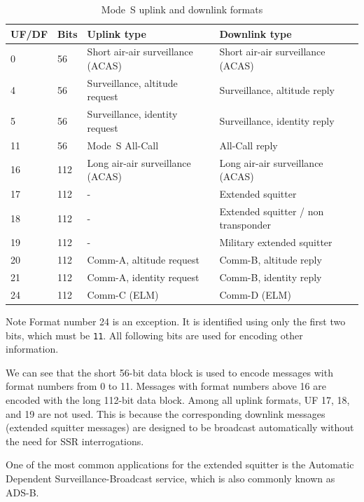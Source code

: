 \begin{table}[ht]
\centering
\footnotesize
\caption{Mode~S uplink and downlink formats}
\label{tb:mode_s_formats}
\begin{tabular}{|l|l|l|l|}
\hline
\textbf{UF/DF} & \textbf{Bits} & \textbf{Uplink type} & \textbf{Downlink type} \\ \hline\hline
0 & 56 & Short air-air surveillance (ACAS) & Short air-air surveillance (ACAS) \\ \hline
4 & 56 & Surveillance, altitude request & Surveillance, altitude reply \\ \hline
5 & 56 & Surveillance, identity request & Surveillance, identity reply \\ \hline
11 & 56 & Mode~S All-Call & All-Call reply \\ \hline
\hline
16 & 112 & Long air-air surveillance (ACAS) & Long air-air surveillance (ACAS) \\ \hline
17 & 112 & - & Extended squitter \\ \hline
18 & 112 & - & Extended squitter / non transponder \\ \hline
19 & 112 & - & Military extended squitter \\ \hline
20 & 112 & Comm-A, altitude request & Comm-B, altitude reply \\ \hline
21 & 112 & Comm-A, identity request & Comm-B, identity reply \\ \hline
24 & 112 & Comm-C (ELM) & Comm-D (ELM) \\ \hline
\end{tabular}
\end{table}


\begin{notebox}{Note}
  Format number 24 is an exception. It is identified using only the first two bits, which must be \texttt{11}. All following bits are used for encoding other information.
\end{notebox}


We can see that the short 56-bit data block is used to encode messages with format numbers from 0 to 11. Messages with format numbers above 16 are encoded with the long 112-bit data block. Among all uplink formats, UF 17, 18, and 19 are not used. This is because the corresponding downlink messages (extended squitter messages) are designed to be broadcast automatically without the need for SSR interrogations. 

One of the most common applications for the extended squitter is the Automatic Dependent Surveillance-Broadcast service, which is also commonly known as ADS-B.


